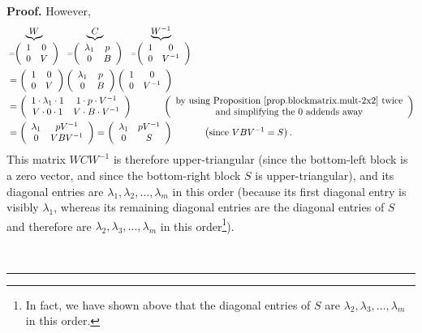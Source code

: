 \documentclass[numbers=enddot,12pt,final,onecolumn,notitlepage]{scrartcl}%
\numberwithin{exer}{subsection}
\theoremstyle{definition}
\newenvironment{proof}[1][Proof]{\noindent\textbf{#1.} }{\ \rule{0.5em}{0.5em}}
\begin{document}
\begin{proof}
However,%
\begin{align*}
&  \underbrace{W}_{=\left(
\begin{array}
[c]{cc}%
1 & 0\\
0 & V
\end{array}
\right)  }\ \ \underbrace{C}_{=\left(
\begin{array}
[c]{cc}%
\lambda_{1} & p\\
0 & B
\end{array}
\right)  }\ \ \underbrace{W^{-1}}_{=\left(
\begin{array}
[c]{cc}%
1 & 0\\
0 & V^{-1}%
\end{array}
\right)  }\\
&  =\left(
\begin{array}
[c]{cc}%
1 & 0\\
0 & V
\end{array}
\right)  \left(
\begin{array}
[c]{cc}%
\lambda_{1} & p\\
0 & B
\end{array}
\right)  \left(
\begin{array}
[c]{cc}%
1 & 0\\
0 & V^{-1}%
\end{array}
\right) \\
&  =\left(
\begin{array}
[c]{cc}%
1\cdot\lambda_{1}\cdot1 & 1\cdot p\cdot V^{-1}\\
V\cdot0\cdot1 & V\cdot B\cdot V^{-1}%
\end{array}
\right)  \ \ \ \ \ \ \ \ \ \ \left(
\begin{array}
[c]{c}%
\text{by using Proposition \ref{prop.blockmatrix.mult-2x2} twice}\\
\text{and simplifying the }0\text{ addends away}%
\end{array}
\right) \\
&  =\left(
\begin{array}
[c]{cc}%
\lambda_{1} & pV^{-1}\\
0 & VBV^{-1}%
\end{array}
\right)  =\left(
\begin{array}
[c]{cc}%
\lambda_{1} & pV^{-1}\\
0 & S
\end{array}
\right)  \ \ \ \ \ \ \ \ \ \ \left(  \text{since }VBV^{-1}=S\right)  .
\end{align*}
This matrix $WCW^{-1}$ is therefore upper-triangular (since the bottom-left
block is a zero vector, and since the bottom-right block $S$ is
upper-triangular), and its diagonal entries are $\lambda_{1},\lambda
_{2},\ldots,\lambda_{m}$ in this order (because its first diagonal entry is
visibly $\lambda_{1}$, whereas its remaining diagonal entries are the diagonal
entries of $S$ and therefore are $\lambda_{2},\lambda_{3},\ldots,\lambda_{m}$
in this order\footnote{In fact, we have shown above that the diagonal entries
of $S$ are $\lambda_{2},\lambda_{3},\ldots,\lambda_{m}$ in this order.}).


\end{proof}
\end{document}
